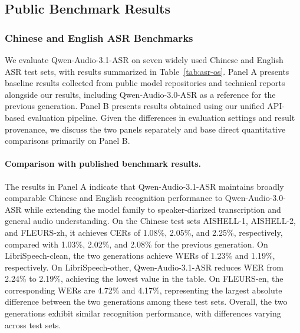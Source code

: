 \documentclass{article}
\begin{document}
\subsection{Public Benchmark Results}
%
%

%
%

%
%

%
%

%
\subsubsection{Chinese and English ASR Benchmarks}

We evaluate Qwen-Audio-3.1-ASR on seven widely used Chinese and English ASR test sets, with results summarized in Table~\ref{tab:asr-os}. Panel A presents baseline results collected from public model repositories and technical reports alongside our results, including Qwen-Audio-3.0-ASR as a reference for the previous generation. Panel B presents results obtained using our unified API-based evaluation pipeline. Given the differences in evaluation settings and result provenance, we discuss the two panels separately and base direct quantitative comparisons primarily on Panel B.

\paragraph{Comparison with published benchmark results.}
The results in Panel A indicate that Qwen-Audio-3.1-ASR maintains broadly comparable Chinese and English recognition performance to Qwen-Audio-3.0-ASR while extending the model family to speaker-diarized transcription and general audio understanding. On the Chinese test sets AISHELL-1, AISHELL-2, and FLEURS-zh, it achieves CERs of 1.08\%, 2.05\%, and 2.25\%, respectively, compared with 1.03\%, 2.02\%, and 2.08\% for the previous generation. On LibriSpeech-clean, the two generations achieve WERs of 1.23\% and 1.19\%, respectively. On LibriSpeech-other, Qwen-Audio-3.1-ASR reduces WER from 2.24\% to 2.19\%, achieving the lowest value in the table. On FLEURS-en, the corresponding WERs are 4.72\% and 4.17\%, representing the largest absolute difference between the two generations among these test sets. Overall, the two generations exhibit similar recognition performance, with differences varying across test sets.
\end{document}
